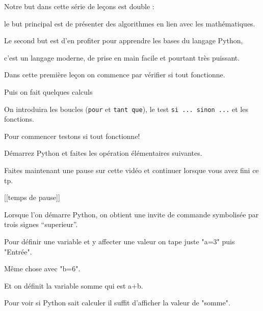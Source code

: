 


\newcommand{\codeinline}[1]{\texttt{#1}}





\debuttexte

\diapo

\change
Notre but dans cette série de leçons est double :

le but principal est de présenter des algorithmes en lien avec les mathématiques.

Le second but est d'en profiter pour apprendre les bases du langage Python,

c'est un langage moderne, de prise en main facile et pourtant très puissant.


\change

Dans cette première leçon on commence par vérifier si tout fonctionne.

\change

Puis on fait quelques calculs

\change

On introduira les boucles (\codeinline{pour} et \codeinline{tant que}),
le test \codeinline{si ... sinon ...} et les fonctions.


\diapo

Pour commencer testons si tout fonctionne!

Démarrez Python et faites les opération élémentaires suivantes.

Faites maintenant une pause sur cette vidéo et continuer lorsque 
vous avez fini ce tp.

[[temps de pause]]

\change

Lorsque l'on démarre Python,
on obtient une invite de commande symbolisée par
trois signes ``superieur''.

Pour définir une variable et y affecter une valeur on 
tape juste "a=3" puis "Entrée".

\change

Même chose avec "b=6".


\change

Et on définit la variable somme qui est a+b.

\change

Pour voir si Python sait calculer il suffit d'afficher la valeur de "somme".

